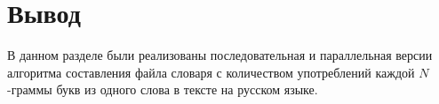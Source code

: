 %
%
%
%
%

\section*{Вывод}

В данном разделе были реализованы последовательная и параллельная версии алгоритма составления файла словаря с количеством употреблений каждой $N$-граммы букв из одного слова в тексте на русском языке.

    